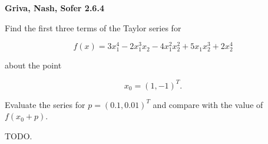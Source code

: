 \textbf{Griva, Nash, Sofer 2.6.4}

Find the first three terms of the Taylor series for 

$$
  f(x) = 3 x_1^4 - 2 x_1^3 x_2 - 4 x_1^2 x_2^2 + 5 x_1 x_2^3 + 2 x_2^4
$$

about the point 

$$
  x_0 = (1, -1)^T.
$$

Evaluate the series for $p = (0.1, 0.01)^T$ and compare with the value of
$f(x_0 + p)$.


\begin{solution}
  TODO.
  \ \\
\end{solution}